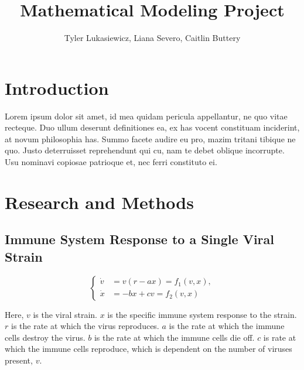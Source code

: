 \documentclass{article}
\title{Mathematical Modeling Project}
\author{Tyler Lukasiewicz, Liana Severo, Caitlin Buttery}
\begin{document}
\maketitle
{}
\section{Introduction}
\label{sec:Introduction}
Lorem ipsum dolor sit amet, id mea quidam pericula appellantur, ne quo vitae recteque. Duo ullum deserunt definitiones ea, ex has vocent constituam inciderint, at novum philosophia has. Summo facete audire eu pro, mazim tritani tibique ne quo. Justo deterruisset reprehendunt qui cu, nam te debet oblique incorrupte. Usu nominavi copiosae patrioque et, nec ferri constituto ei.


\section{Research and Methods}
\label{sec:Main part}

\subsection{Immune System Response to a Single Viral Strain}
\begin{equation}
    \begin{cases}
        \dot v &= v(r-ax) = f_1(v,x), \\
        \dot x &= -bx + cv = f_2(v,x)
    \end{cases}
\end{equation}

Here, $v$ is the viral strain. $x$ is the specific immune system response to the strain. $r$ is the rate at which the virus reproduces. $a$ is the rate at which the immune cells destroy the virus. $b$ is the rate at which the immune cells die off. $c$ is rate at which the immune cells reproduce, which is dependent on the number of viruses present, $v$.  
\end{document}
